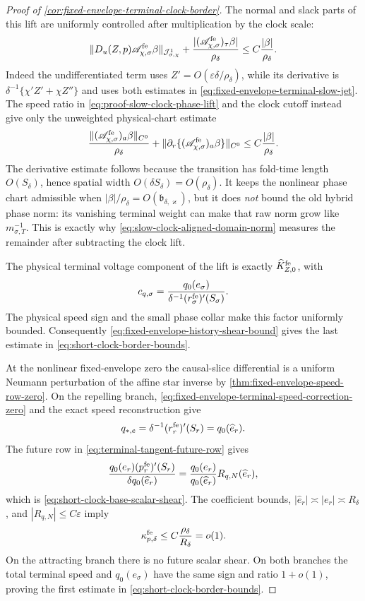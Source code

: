 \begin{proof}[Proof of
\cref{cor:fixed-envelope-terminal-clock-border}]
The normal and slack parts of this lift are uniformly controlled after
multiplication by the clock scale:
\begin{equation}
 \|D_u(Z,p)\mathscr A_{\chi,\sigma}^{\rm fe}\beta\|_
       {\mathcal J_{\sigma,\chi}^1}
 +\frac{|(\mathscr A_{\chi,\sigma}^{\rm fe})_\tau\beta|}
       {\rho_\delta}
 \le C\frac{|\beta|}{\rho_\delta}.             \label{eq:proof-slow-clock-normal-shear}
\end{equation}
Indeed the undifferentiated term uses
\(Z'=O(\varepsilon\delta/\rho_\delta)\), while its derivative is
\(\delta^{-1}\{\chi'Z'+\chi Z''\}\) and uses both estimates in
\cref{eq:fixed-envelope-terminal-slow-jet}.  The speed ratio in
\cref{eq:proof-slow-clock-phase-lift} and the clock cutoff instead give
only the unweighted physical-chart estimate
\begin{equation}
 \frac{\|(\mathscr A_{\chi,\sigma}^{\rm fe})_a\beta\|_{C^0}}
          {\rho_\delta}
 +\|\partial_r\{(\mathscr A_{\chi,\sigma}^{\rm fe})_a\beta\}\|_{C^0}
 \le C\frac{|\beta|}{\rho_\delta}.             \label{eq:proof-slow-clock-phase-admissibility}
\end{equation}
The derivative estimate follows because the transition has fold-time
length \(O(S_\delta)\), hence spatial width
\(O(\delta S_\delta)=O(\rho_\delta)\).  It keeps the nonlinear phase
chart admissible when
\(|\beta|/\rho_\delta=O(\mathfrak b_{\delta,\varkappa})\), but it does
\emph{not} bound the old hybrid phase norm: its vanishing terminal weight
can make that raw norm grow like \(m_{\sigma,T}^{-1}\).  This is exactly
why \cref{eq:slow-clock-aligned-domain-norm} measures the remainder after
subtracting the clock lift.

The physical terminal voltage component of the lift is exactly
\(\widehat K_{Z,0}^{\rm fe}\), with
\[
 c_{q,\sigma}=\frac{q_0(e_\sigma)}
 {\delta^{-1}(r_\sigma^{\rm fe})'(S_\sigma)}.
\]
The physical speed sign and the small phase collar make this factor
uniformly bounded.  Consequently
\cref{eq:fixed-envelope-history-shear-bound} gives the last estimate in
\cref{eq:short-clock-border-bounds}.

At the nonlinear fixed-envelope zero the causal-slice differential is a
uniform Neumann perturbation of the affine star inverse by
\cref{thm:fixed-envelope-speed-row-zero}.  On the repelling branch,
\cref{eq:fixed-envelope-terminal-speed-correction-zero} and the exact
speed reconstruction give
\[
 q_{*,e}=\delta^{-1}(r_r^{\rm fe})'(S_r)
         =q_0(\widehat e_r).
\]
The future row in
\cref{eq:terminal-tangent-future-row} gives
\[
 \frac{q_0(e_r)(p_r^{\rm fe})'(S_r)}
      {\delta q_0(\widehat e_r)}
 =\frac{q_0(e_r)}{q_0(\widehat e_r)}
       R_{q,N}(\widehat e_r),
\]
which is \cref{eq:short-clock-base-scalar-shear}.  The coefficient bounds,
\(|\widehat e_r|\asymp|e_r|\asymp R_\delta\), and
\(|R_{q,N}|\le C\varepsilon\) imply
\[
 \kappa_{p,\delta}^{\rm fe}
 \le C\frac{\rho_\delta}{R_\delta}=o(1).
\]
On the attracting branch there is no future scalar shear.  On both
branches the total terminal speed and \(q_0(e_\sigma)\) have the same sign
and ratio \(1+o(1)\), proving the first estimate in
\cref{eq:short-clock-border-bounds}.


\end{proof}
